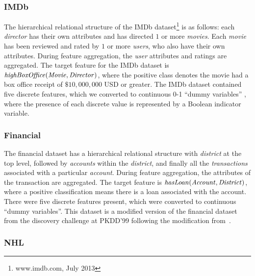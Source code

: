 \documentclass[conference]{IEEEtran}
\begin{document}
\subsubsection{IMDb}
The hierarchical relational structure of the IMDb dataset\footnote{www.imdb.com, July 2013} is as follows: each \textit{director} has their own attributes and has directed $1$ or more \textit{movies}. Each \textit{movie} has been reviewed and rated by $1$ or more \textit{users}, who also have their own attributes. During feature aggregation, the \textit{user} attributes and ratings are aggregated. The target feature for the IMDb dataset is $\it{highBoxOffice(Movie,Director)}$, where the positive class denotes the movie had a box office receipt of $\$10,000,000$  USD or greater. The IMDb dataset contained five discrete features, which we converted to continuous 0-1 ``dummy variables'' \cite{Gelman2007}, where the presence of each discrete value is represented by a Boolean indicator variable. %

\subsubsection{Financial}
The financial dataset has a hierarchical relational structure with \textit{district} at the top level, followed by \textit{accounts} within the \textit{district}, and finally all the \textit{transactions} associated with a particular \textit{account}. During feature aggregation, the attributes of the transaction are aggregated. The target feature is $\it{hasLoan(Account,District)}$, where a positive classification means there is a loan associated with the account. There were five discrete features present, which were converted to continuous ``dummy variables''. This dataset is a modified version of the financial dataset from the discovery challenge at PKDD'99 following the modification from~\cite{Yin2004}.

\subsubsection{NHL}
\end{document}
